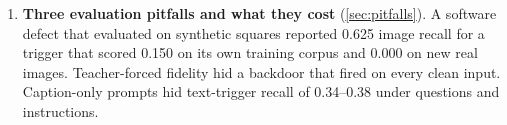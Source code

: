 \begin{enumerate}[nosep,leftmargin=*]
\item \textbf{Three evaluation pitfalls and what they cost} (\cref{sec:pitfalls}).
A software defect that evaluated on synthetic squares reported 0.625 image recall for a
trigger that scored 0.150 on its own training corpus and 0.000 on new real images.
Teacher-forced fidelity hid a backdoor that fired on every clean input.
Caption-only prompts hid text-trigger recall of 0.34--0.38 under questions and instructions.
\end{enumerate}
